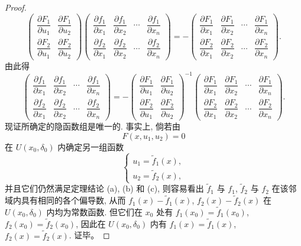 \documentclass[UTF8,12pt,a4paper,fontset=fandol]{ctexart}
\begin{document}
\begin{proof}
\[
  \begin{pmatrix}
    \dfrac{\partial F_1}{\partial u_1} &
    \dfrac{\partial F_1}{\partial u_2}\\
    \dfrac{\partial F_2}{\partial u_1} &
    \dfrac{\partial F_2}{\partial u_2}
  \end{pmatrix}
  \begin{pmatrix}
    \dfrac{\partial f_1}{\partial x_1} &
    \dfrac{\partial f_1}{\partial x_2} &
    \cdots &
    \dfrac{\partial f_1}{\partial x_n}\\
    \dfrac{\partial f_2}{\partial x_1} &
    \dfrac{\partial f_2}{\partial x_2} &
    \cdots &
    \dfrac{\partial f_2}{\partial x_n}
  \end{pmatrix}
  =-
  \begin{pmatrix}
    \dfrac{\partial F_1}{\partial x_1} &
    \dfrac{\partial F_1}{\partial x_2} &
    \cdots &
    \dfrac{\partial F_1}{\partial x_n}\\
    \dfrac{\partial F_2}{\partial x_1} &
    \dfrac{\partial F_2}{\partial x_2} &
    \cdots &
    \dfrac{\partial F_2}{\partial x_n}
  \end{pmatrix}.
\]
由此得
\[
  \begin{pmatrix}
    \dfrac{\partial f_1}{\partial x_1} &
    \dfrac{\partial f_1}{\partial x_2} &
    \cdots &
    \dfrac{\partial f_1}{\partial x_n}\\
    \dfrac{\partial f_2}{\partial x_1} &
    \dfrac{\partial f_2}{\partial x_2} &
    \cdots &
    \dfrac{\partial f_2}{\partial x_n}
  \end{pmatrix}
  =-
  \begin{pmatrix}
    \dfrac{\partial F_1}{\partial u_1} &
    \dfrac{\partial F_1}{\partial u_2}\\
    \dfrac{\partial F_2}{\partial u_1} &
    \dfrac{\partial F_2}{\partial u_2}
  \end{pmatrix}^{-1}
  \begin{pmatrix}
    \dfrac{\partial F_1}{\partial x_1} &
    \dfrac{\partial F_1}{\partial x_2} &
    \cdots &
    \dfrac{\partial F_1}{\partial x_n}\\
    \dfrac{\partial F_2}{\partial x_1} &
    \dfrac{\partial F_2}{\partial x_2} &
    \cdots &
    \dfrac{\partial F_2}{\partial x_n}
  \end{pmatrix}.
\]
现证所确定的隐函数组是唯一的. 事实上, 倘若由
\[
  F(x,u_1,u_2)=0
\]
在 $U(x_0,\delta_0)$ 内确定另一组函数
\[
  \begin{cases}
    u_1=\tilde f_1(x),\\
    u_2=\tilde f_2(x),
  \end{cases}
\]
并且它们仍然满足定理结论 (a), (b) 和 (c), 则容易看出 $\tilde f_1$ 与 $f_1$, $\tilde f_2$ 与 $f_2$ 在该邻域内具有相同的各个偏导数, 从而 $f_1(x)-\tilde f_1(x)$, $f_2(x)-\tilde f_2(x)$ 在 $U(x_0,\delta_0)$ 内均为常数函数. 但它们在 $x_0$ 处有 $f_1(x_0)=\tilde f_1(x_0)$, $f_2(x_0)=\tilde f_2(x_0)$, 因此在 $U(x_0,\delta_0)$ 内有 $f_1(x)=\tilde f_1(x)$, $f_2(x)=\tilde f_2(x)$. 证毕。

\end{proof}
\end{document}

